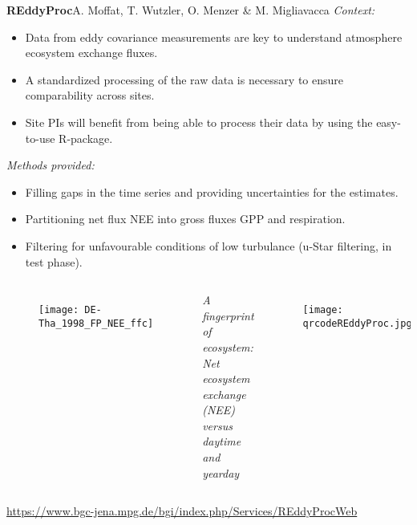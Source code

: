\documentclass[final,hyperref={pdfpagelabels=false}, professionalmath, mathserif, 11pt]{beamer}
\begin{document}
\begin{frame}
\vspace{3ex}
\begin{columns}
\begin{column}{.48\textwidth}
\begin{center}
\begin{minipage}[T]{.95\textwidth}
\parbox[t][\columnheight]{\textwidth}{

\begin{block}{\vspace{.2cm}\textbf{REddyProc}\hfill\normalsize{A. Moffat, T. Wutzler, O. Menzer \& M. Migliavacca}}
\alert{\textit{Context:}}
\begin{itemize}
    \item Data from eddy covariance measurements are key to understand atmosphere ecosystem exchange fluxes.
    \item A standardized processing of the raw data is necessary to ensure comparability across sites.
    \item Site PIs will benefit from being able to process their data by using the easy-to-use R-package.
\end{itemize}
 
\alert{\textit{Methods provided:}}
\begin{itemize}
    \item Filling gaps in the time series and providing uncertainties for the estimates.
    \item Partitioning net flux NEE into gross fluxes GPP and respiration.
    \item Filtering for unfavourable conditions of low turbulance (u-Star filtering, in test phase).
\end{itemize}
\vspace{1cm}

\begin{columns}
    \begin{figure}[tb]
    \begin{center}
        \texttt{[image: DE-Tha\_1998\_FP\_NEE\_ffc]}
    \end{center}
    \end{figure}
\small{\textit{A fingerprint of ecosystem: Net ecosystem exchange (NEE) versus daytime and yearday}}
\vspace{4cm}
	\begin{figure}[tb]
		\texttt{[image: qrcodeREddyProc.jpg]}
	\end{figure}
\end{columns}
\vspace{1cm}
\hfill\large{\url{https://www.bgc-jena.mpg.de/bgi/index.php/Services/REddyProcWeb}}
\end{block}
\vspace{3ex}

}
\end{minipage}
\end{center}
\end{column}
\end{columns}
\end{frame}
\end{document}

